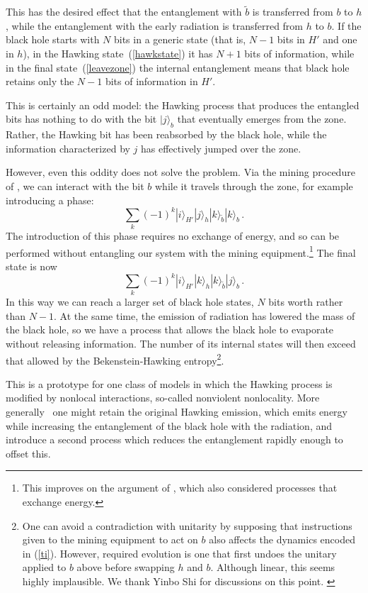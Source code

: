 \documentclass[12pt]{article}
\newcommand{\be}{\begin{equation}}
\newcommand{\ee}{\end{equation}}
\begin{document}
{This has the desired effect that the entanglement with $\tilde b$ is transferred from $b$ to $h$, while the entanglement with the early radiation is transferred from $h$ to $b$.  If the black hole starts with $N$ bits in a generic state (that is, $N-1$ bits in $H'$ and one in $h$), in the Hawking state~(\ref{hawkstate}) it has $N+1$ bits of information, while in the final state~(\ref{leavezone}) the internal entanglement means that black hole retains only the $N-1$ bits of information in $H'$.

This is certainly an odd model: the Hawking process that produces the entangled bits has nothing to do with the bit $|j\rangle_{b}$ that eventually emerges from the {zone}.  Rather, the Hawking bit has been reabsorbed by the black hole, while the information characterized by $j$ has effectively jumped over the {zone}.

However, even this oddity does not solve the problem.  Via the mining procedure of \cite{Unruh:1982ic,Brown:2012un}, we can interact with the bit $b$ while it travels through the {zone}, for example introducing a phase:
\be
\sum_k  (-1)^k |i\rangle_{H'} |j\rangle_{h} |k\rangle_{\tilde b} |k\rangle_{b} \,.
\ee
{The introduction of this phase requires no exchange of energy, and so can be performed without entangling our system with the mining equipment.\footnote{This improves on the argument of \cite{Almheiri:2012rt}, which also considered processes that exchange energy.}}
The final state is now
\be
\sum_k (-1)^k   |i\rangle_{H'} |k\rangle_{h} |k\rangle_{\tilde b} |j\rangle_{b} \,.
\ee
In this way we can reach a larger set of black hole states, $N$ bits worth rather than $N-1$.  At the same time, the emission of radiation has lowered the mass of the black hole, so we have a process that allows the black hole to evaporate without releasing information.  The number of its internal states will then exceed that allowed by the Bekenstein-Hawking entropy\footnote{One can avoid a contradiction with unitarity by supposing that instructions given to the mining equipment to act on $b$ also affects the dynamics encoded in  (\ref{ti}).  However, required evolution is one that first undoes the unitary applied to $b$ above before swapping $h$ and $b$.   Although linear, this seems highly implausible.  We thank Yinbo Shi for discussions on this point. \label{implausible}}.



This is a prototype for one class of models in which the Hawking process is modified by nonlocal interactions, so-called nonviolent nonlocality.  More generally~\cite{Giddings:2011ks,Giddings:2012gc,Giddings:2013kcj} one might retain the original Hawking emission, which emits energy while increasing the entanglement of the black hole with the radiation, and introduce a second process which reduces the entanglement rapidly enough to offset this.

}
\end{document}
